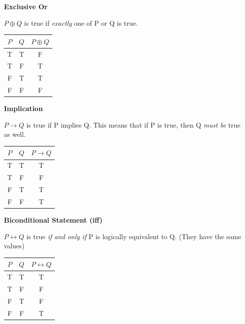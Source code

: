 \documentclass[12pt,letterpaper]{article} \usepackage{amsmath} \usepackage{graphicx}  \usepackage{longtable}  \usepackage{amssymb}
\begin{document}
\begin{centering}
                \textbf{Exclusive Or}

                $P \oplus Q $ is true if \emph{exactly} one of P or Q is true.
                
                \vspace{6pt}
                \begin{tabular}{c c|c}
                    \textbf{$P$} & \textbf{$Q$} & \textbf{$P \oplus Q$} \\
                    \hline
                    T & T & F \\
                    T & F & T \\
                    F & T & T \\
                    F & F & F \\
                \end{tabular}
        
                \textbf{Implication}

                $P \to Q $ is true if P implies Q. This means that if P is true, then Q \emph{must be} true as well.
                
                \vspace{6pt}
                \begin{tabular}{c c|c}
                    \textbf{$P$} & \textbf{$Q$} & \textbf{$P \to Q$} \\
                    \hline
                    T & T & T \\
                    T & F & F \\
                    F & T & T \\
                    F & F & T \\
                \end{tabular}
        
                \textbf{Biconditional Statement (iff)}

                $P \leftrightarrow Q $ is true \emph{if and only if} P is logically equivalent to Q. (They have the same values)
                
                \vspace{6pt}
                \begin{tabular}{c c|c}
                    \textbf{$P$} & \textbf{$Q$} & \textbf{$P \leftrightarrow Q$} \\
                    \hline
                    T & T & T \\
                    T & F & F \\
                    F & T & F \\
                    F & F & T \\
                \end{tabular}

            \end{centering}
\end{document}
